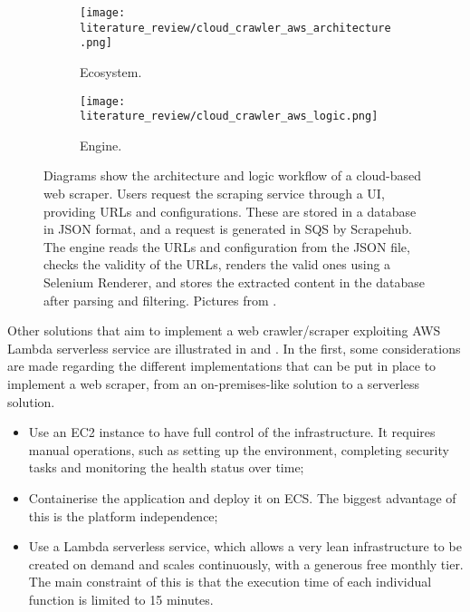 \documentclass[../thesis.tex]{subfiles}
\begin{document}
\begin{figure}[H]
    \centering
    \begin{subfigure}[t]{.45\textwidth}
        \centering
        \texttt{[image: literature\_review/cloud\_crawler\_aws\_architecture.png]}
        \caption{Ecosystem.}
        \label{fig:cloud_crawler_aws_architecture}
    \end{subfigure}
    \hfill
    \begin{subfigure}[t]{.45\textwidth}
        \centering
        \texttt{[image: literature\_review/cloud\_crawler\_aws\_logic.png]}
        \caption{Engine.}
        \label{fig:cloud_crawler_aws_logic}
    \end{subfigure}
    \caption[Example of cloud-based web scraper architecture]{Diagrams show the architecture and logic workflow of a cloud-based web scraper. Users request the scraping service through a \acrshort{UI}, providing URLs and configurations. These are stored in a database in \acrshort{JSON} format, and a request is generated in \acrshort{SQS} by Scrapehub. The engine reads the \acrshort{URL}s and configuration from the \acrshort{JSON} file, checks the validity of the \acrshort{URL}s, renders the valid ones using a Selenium Renderer, and stores the extracted content in the database after parsing and filtering. Pictures from  \cite{inproceedings:cloud_web_scraping_2017}.}
    \label{fig:cloud_crawler_aws}
\end{figure}

Other solutions that aim to implement a web crawler/scraper exploiting \acrshort{AWS} Lambda serverless service are illustrated in \cite{site:aws_serverless_web_scraping_2020} and \cite{site:aws_serverless_crawler_engine_2021}. In the first, some considerations are made regarding the different implementations that can be put in place to implement a web scraper, from an on-premises-like solution to a serverless solution.

\begin{itemize}
    \item Use an \acrshort{EC2} instance to have full control of the infrastructure. It requires manual operations, such as setting up the environment, completing security tasks and monitoring the health status over time;
    \item Containerise the application and deploy it on \acrlong{ECS}. The biggest advantage of this is the platform independence;
    \item Use a Lambda serverless service, which allows a very lean infrastructure to be created on demand and scales continuously, with a generous free monthly tier. The main constraint of this is that the execution time of each individual function is limited to 15 minutes.
\end{itemize}
\end{document}
